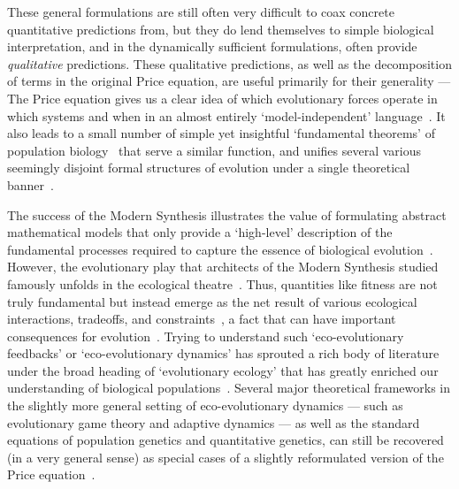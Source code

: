These general formulations are still often very difficult to coax concrete quantitative predictions from, but they do lend themselves to simple biological interpretation, and in the dynamically sufficient formulations, often provide \emph{qualitative} predictions. These qualitative predictions, as well as the decomposition of terms in the original Price equation, are useful primarily for their generality --- The Price equation gives us a clear idea of which evolutionary forces operate in which systems and when in an almost entirely `model-independent' language~\citep{okasha_evolution_2006,frank_natural_2012,queller_fundamental_2017,luque_one_2017}. It also leads to a small number of simple yet insightful `fundamental theorems' of population biology~\citep{queller_fundamental_2017, lion_theoretical_2018, lehtonen_price_2018} that serve a similar function, and unifies several various seemingly disjoint formal structures of evolution under a single theoretical banner~\citep{ lehtonen_price_2020, luque_mirror_2021}.

The success of the Modern Synthesis illustrates the value of formulating abstract mathematical models that only provide a `high-level' description of the fundamental processes required to capture the essence of biological evolution~\citep{provine_origins_2001,walsh_darwins_2014}. However, the evolutionary play that architects of the Modern Synthesis studied famously unfolds in the ecological theatre~\citep{hutchinson_ecological_1965}. Thus, quantities like fitness are not truly fundamental but instead emerge as the net result of various ecological interactions, tradeoffs, and constraints~\citep{metz_how_1992}, a fact that can have important consequences for evolution~\citep{coulson_putting_2006,schoener_newest_2011, kokko_can_2017}. Trying to understand such `eco-evolutionary feedbacks' or `eco-evolutionary dynamics' has sprouted a rich body of literature under the broad heading of `evolutionary ecology' that has greatly enriched our understanding of biological populations~\citep{coulson_putting_2006,metcalf_why_2007,schoener_newest_2011,brown_why_2016,kokko_can_2017,lion_theoretical_2018,govaert_eco-evolutionary_2019,svensson_eco-evolutionary_2019,hendry_critique_2019}. Several major theoretical frameworks in the slightly more general setting of eco-evolutionary dynamics --- such as evolutionary game theory and adaptive dynamics --- as well as the standard equations of population genetics and quantitative genetics, can still be recovered (in a very general sense) as special cases of a slightly reformulated version of the Price equation~\citep{page_unifying_2002,lion_theoretical_2018}.

